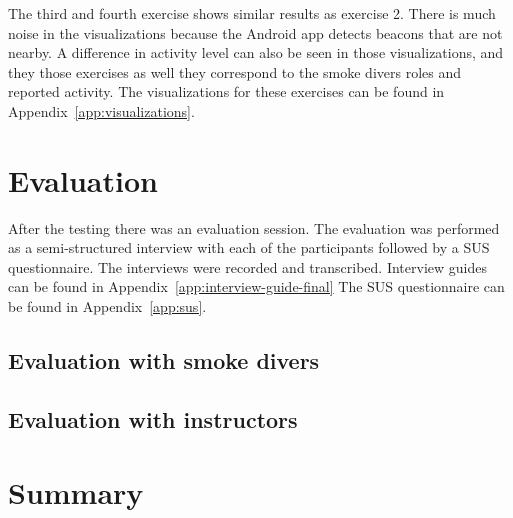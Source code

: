 \documentclass[../Main/thesis.tex]{subfiles}
\begin{document}
The third and fourth exercise shows similar results as exercise 2.
There is much noise in the visualizations because the Android app detects beacons that are not nearby.
A difference in activity level can also be seen in those visualizations, and they those exercises as well they correspond to the smoke divers roles and reported activity.
The visualizations for these exercises can be found in Appendix~\ref{app:visualizations}.

\section{Evaluation}
After the testing there was an evaluation session.
The evaluation was performed as a semi-structured interview with each of the participants followed by a SUS questionnaire.
The interviews were recorded and transcribed.
Interview guides can be found in Appendix~\ref{app:interview-guide-final}
The SUS questionnaire can be found in Appendix~\ref{app:sus}.

\subsection{Evaluation with smoke divers}

\subsection{Evaluation with instructors}

\section{Summary}
\end{document}
